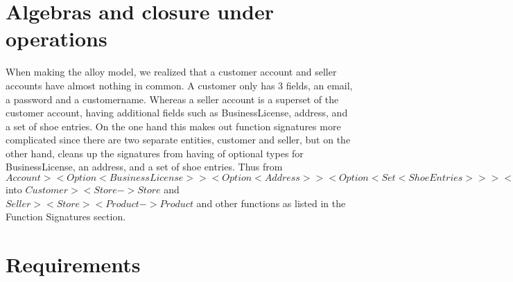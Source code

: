 \section{Algebras and closure under operations}
When making the alloy model, we realized that a customer account and seller accounts have almost nothing in common. A customer only has 3 fields, an email, a password and a customername. Whereas a seller account is a superset of the customer account, having additional fields such as BusinessLicense, address, and a set of shoe entries. On the one hand this makes out function signatures more complicated since there are two separate entities, customer and seller, but on the other hand, cleans up the signatures from having of optional types for BusinessLicense, an address, and a set of shoe entries. Thus from $Account >< Option<BusinessLicense>> < Option<Address> >< Option<Set<ShoeEntries>> >< Store -> Store$ into $Customer >< Store -> Store$ and $Seller >< Store >< Product -> Product$ and other functions as listed in the Function Signatures section.
\newpage
\section{Requirements}
